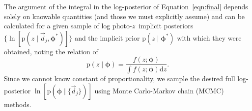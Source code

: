 \documentclass[iop]{emulateapj}
\newcommand{\Eq}[1]{Equation~\ref{#1}}
\newcommand{\data}{\ensuremath{\vec{d}}}%
\newcommand{\pr}[1]{\ensuremath{\mathrm{p}(#1)}}%
\newcommand{\gvn}{\mid}%
\newcommand{\integral}[2]{\ensuremath{\int #1 \mathrm{d} #2}}
\newcommand{\pz}{photo-$z$}
\newcommand{\pzip}{\pz\ implicit posterior}
\newcommand{\bvec}[1]{\ensuremath{\boldsymbol{#1}}}%
\newcommand{\ndphi}{\bvec{\phi}}
\begin{document}
The argument of the integral in the log-posterior of \Eq{eqn:final} depends solely on knowable quantities (and those we must explicitly assume) and can be calculated for a given sample of log \pzip s $\{\ln[\pr{z \gvn \data_{j}, \ndphi^{*}}]\}$ and the implicit prior $\pr{z \gvn \ndphi^{*}}$ with which they were obtained, noting the relation of
\begin{equation}
\label{eqn:params}
\pr{z \gvn \ndphi} = \frac{f(z; \ndphi)}{\integral{f(z; \ndphi)}{z}}.
\end{equation}
Since we cannot know constant of proportionality, we sample the desired full log-posterior $\ln[\pr{\ndphi \gvn \{\data_{j}\}}]$ using Monte Carlo-Markov chain (MCMC) methods.

%
\end{document}
